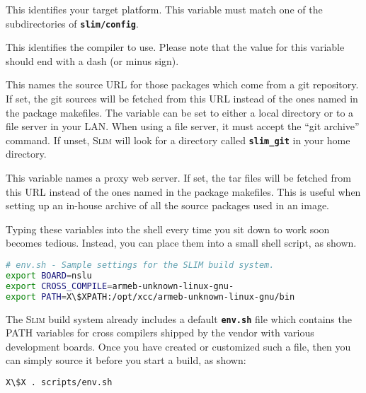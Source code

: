 \documentclass[a4paper,10pt]{article}
\newenvironment{Description}[1][\quad]{%
  \begin{list}{}{%
      \renewcommand{\makelabel}[1]{\textbf{##1}\hfill}%
      \settowidth{\labelwidth}{\textbf{#1}}%
      \setlength{\leftmargin}{\labelwidth+\labelsep}%
  }%
}{%
  \end{list}%
}
\newcommand{\slim}{\textsc{Slim}\xspace}
\newcommand{\fw}{\tt\bf}
\begin{document}
    \begin{Description}[CROSS\_COMPILE ]

    \item[BOARD]
      This identifies your target platform. This variable must match
      one of the subdirectories of {\fw slim/config}.

    \item[CROSS\_COMPILE]
      This identifies the compiler to use. Please note that the value
      for this variable should end with a dash (or minus sign).

    \item[SLIM\_GIT]
      This names the source URL for those packages which come from a
      git repository. If set, the git sources will be fetched from
      this URL instead of the ones named in the package makefiles.
      The variable can be set to either a local directory or to a file
      server in your LAN. When using a file server, it must accept the
      ``git archive'' command.  If unset, \slim will look for a
      directory called {\fw slim\_git} in your home directory.

    \item[SLIM\_WGET]
      This variable names a proxy web server. If set, the tar files
      will be fetched from this URL instead of the ones named in the
      package makefiles. This is useful when setting up an in-house
      archive of all the source packages used in an image.

    \end{Description}

    Typing these variables into the shell every time you sit down to
    work soon becomes tedious. Instead, you can place them into a
    small shell script, as shown.

\begin{lstlisting}[language=bash,escapechar=X]
# env.sh - Sample settings for the SLIM build system.
export BOARD=nslu
export CROSS_COMPILE=armeb-unknown-linux-gnu-
export PATH=X\$XPATH:/opt/xcc/armeb-unknown-linux-gnu/bin
\end{lstlisting}

    The \slim build system already includes a default {\fw env.sh}
    file which contains the PATH variables for cross compilers shipped
    by the vendor with various development boards. Once you have
    created or customized such a file, then you can simply source it
    before you start a build, as shown:

\begin{lstlisting}[language=bash,escapechar=X]
X\$X . scripts/env.sh
\end{lstlisting}
\end{document}
